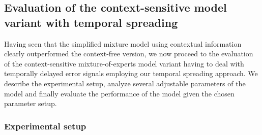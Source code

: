 \subsection{Evaluation of the context-sensitive model variant with temporal spreading}%
\label{subsec:evaluation_of_the_context_sensitive_model_variant_with_temporal_spreading}

Having seen that the simplified mixture model using contextual information clearly outperformed the context-free version, we now proceed to the evaluation of the context-sensitive mixture-of-experts model variant having to deal with temporally delayed error signals employing our temporal spreading approach.
We describe the experimental setup, analyze several adjustable parameters of the model and finally evaluate the performance of the model given the chosen parameter setup.

\subsubsection{Experimental setup}%
\label{ssubsec:experimental_setup}

